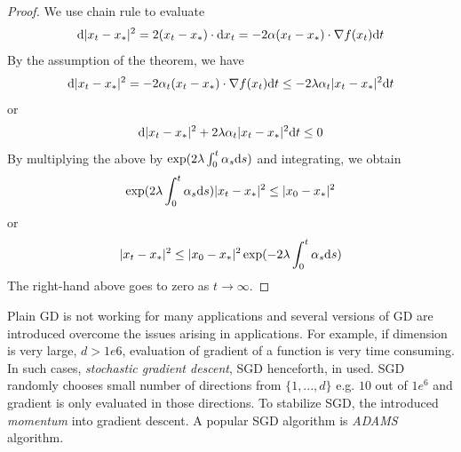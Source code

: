 \documentclass[11pt]{book}
\newcommand{\dd}{\text{\normalfont d}}
\newcommand{\dt}{\text{\normalfont d}t}
\newcommand{\ds}{\text{\normalfont d}s}
\newcommand{\dx}{\text{\normalfont d}x}
\begin{document}
\begin{proof}
    We use chain rule to evaluate 
    \[
    \dd |x_t-x_*|^2 = 2(x_t-x_*)\cdot \dx_t = -2 \alpha (x_t-x_*)\cdot\nabla f(x_t) \dt
    \]
    By the assumption of the theorem, we have
    \[
    \dd |x_t-x_*|^2 = -2 \alpha_t (x_t-x_*)\cdot\nabla f(x_t) \dt\le -2\lambda\alpha_t |x_t-x_*|^2\dt
    \]
    or
    \[
    \dd |x_t-x_*|^2 + 2\lambda\alpha_t |x_t-x_*|^2\dt \le 0
    \]
    By multiplying the above by $\exp(2\lambda\int_0^t\alpha_s\ds)$ and integrating, we obtain
    \[
    \exp(2\lambda\int_0^t\alpha_s\ds)|x_t-x_*|^2\le |x_0-x_*|^2
    \]
    or
    \[
    |x_t-x_*|^2\le |x_0-x_*|^2\exp(-2\lambda\int_0^t\alpha_s\ds)
    \]
    The right-hand above goes to zero as $t\to\infty$.
\end{proof}

Plain GD is not working for many applications and several versions of GD are introduced overcome the issues arising in applications. For example, if dimension is very large, $d>1e6$, evaluation of gradient of a function is very time consuming. In such cases, \emph{stochastic gradient descent}, SGD henceforth, in used. SGD randomly chooses small number of directions from $\{1,...,d\}$ e.g. $10$ out of $1e^6$ and gradient is only evaluated in those directions. To stabilize SGD, the introduced \emph{momentum} into gradient descent. A popular SGD algorithm is \emph{ADAMS} algorithm. 

\newpage 
\end{document}

